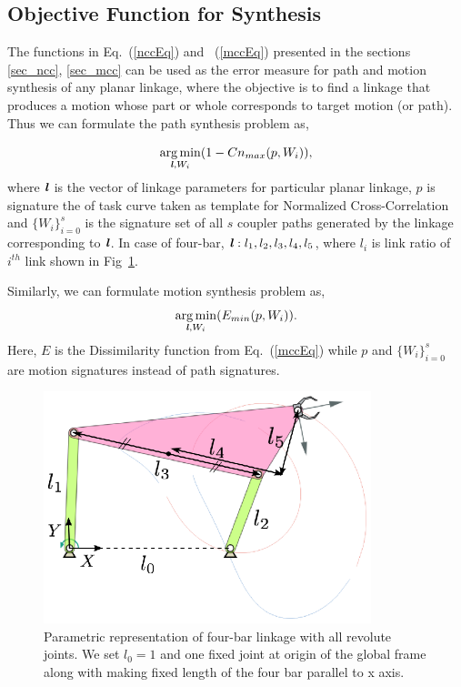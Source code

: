 \documentclass[twocolumn,10pt]{asme2ej}
\newcommand{\req}[1]{(\ref{#1})}
\DeclareMathOperator*{\argminA}{arg\,min}
\begin{document}
\subsection{Objective Function for Synthesis}
The functions in Eq.~\req{nccEq} and ~\req{mccEq} presented in the sections \ref{sec_ncc}, \ref{sec_mcc} can be used as the error measure for path and motion synthesis of any planar linkage, where the objective is to find a linkage that produces a motion whose part or whole corresponds to target motion (or path).
Thus we can formulate the path synthesis problem as,

\begin{equation}\label{objectiveFunPath}
  \argminA_{\textbf{\emph{l}}, W_i} (1 - Cn_{max}(p, W_i)),
\end{equation}
where $\textbf{\emph{l}}$ is the vector of linkage parameters for particular planar linkage, $p$ is signature the of task curve taken as template for Normalized Cross-Correlation and ${\{W_i\}}_{i=0}^{s}$ is the signature set of all $s$ coupler paths generated by the linkage corresponding to $\textbf{\emph{l}}$.
In case of four-bar, $\textbf{\emph{l}}: l_1, l_2, l_3, l_4, l_5$, where $l_i$ is link ratio of $i^{th}$ link shown in Fig~\ref{fourbar}.

Similarly, we can formulate motion synthesis problem as,
\begin{equation}\label{objectiveFunMotion}
  \argminA_{\textbf{\emph{l}}, W_i} (E_{min}(p, W_i)).
\end{equation}
Here, $E$ is the Dissimilarity function from Eq.~\req{mccEq} while $p$ and ${\{W_i\}}_{i=0}^{s}$ are motion signatures instead of path signatures.

\begin{figure}
\centering
\includegraphics[width=270pt]{figure/fig_fourbar.eps}
  \caption{Parametric representation of four-bar linkage with all revolute joints. We set $l_0 = 1$ and one fixed joint at origin of the global frame along with making fixed length of the four bar parallel to x axis.}
\label{fourbar}
\end{figure}
\end{document}
